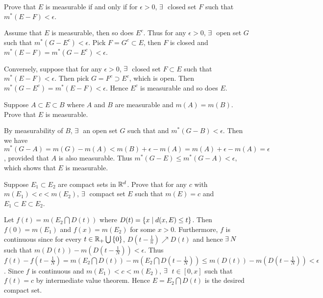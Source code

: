 \begin{exercise}
    Prove that $E$ is measurable if and only if for $\epsilon>0$, 
    $\exists\:$ closed set $F$ such that $m^*(E-F)<\epsilon$.
\end{exercise}
\begin{pf}
    Assume that $E$ is measurable, then so does $E^c$. Thus 
    for any $\epsilon>0$, $\exists\:$ open set $G$ such that 
    $m^*(G-E^c)<\epsilon$. Pick $F = G^c \subset E$, then $F$ 
    is closed and $m^*(E-F) = m^*(G-E^c)<\epsilon$. 

    Conversely, suppose that for any $\epsilon>0$, $\exists\:$ 
    closed set $F\subset E$ such that $m^*(E-F)<\epsilon$. 
    Then pick $G = F^c \supset E^c$, which is open. Then 
    $m^*(G-E^c) = m^*(E-F)<\epsilon$. Hence $E^c$ is 
    measurable and so does $E$. 
\end{pf}

\begin{exercise}
    Suppose $A\subset E\subset B$ where $A$ and $B$ are measurable 
    and $m(A) = m(B)$. Prove that $E$ is measurable.
\end{exercise}
\begin{pf}
    By measurability of $B$, $\exists\:$ an open set $G$ such 
    that and $m^*(G-B)<\epsilon$. Then we have $m^*(G-A) = 
    m(G)-m(A) < m(B)+\epsilon - m(A) =  m(A) + \epsilon - m(A) 
    = \epsilon$, provided that $A$ is also measurable. Thus 
    $m^*(G-E)\leq m^*(G-A) < \epsilon$, which shows that $E$ 
    is measurable.
\end{pf}

\begin{exercise}
    Suppose $E_1\subset E_2$ are compact sets in $\mathbb{R}^d$. Prove 
    that for any $c$ with $m(E_1)<c<m(E_2)$, $\exists\:$ compact 
    set $E$ such that $m(E) = c$ and $E_1\subset E\subset E_2$.
\end{exercise}
\begin{pf}
    Let $f(t) = m(E_2\bigcap D(t))$ where $D(t)=
    \left\{ x \;\middle\vert\; d(x,E)\leq t \right\}$. Then $f(0)=m(E_1)$ and $f(x)=m(E_2)$ 
    for some $x>0$. Furthermore, $f$ is continuous since for every 
    $t\in\mathbb{R}_+\bigcup\left\{ {0} \right\}$, $D(t-\frac{1}{n})\nearrow D(t)$ and 
    hence $\exists\: N$ such that $m(D(t))-m(D(t-\frac{1}{N}))
    <\epsilon$. Thus $f(t)-f(t-\frac{1}{N}) = m(E_2\bigcap D(t))
    - m(E_2\bigcap D(t-\frac{1}{N})) \leq m(D(t)) - 
    m(D(t-\frac{1}{N}))<\epsilon$. Since $f$ is continuous and 
    $m(E_1)<c<m(E_2)$, $\exists\:$ $t\in [0,x]$ such that $f(t)=c$
    by intermediate value theorem. Hence $E = E_2\bigcap D(t)$ 
    is the desired compact set.
\end{pf}

